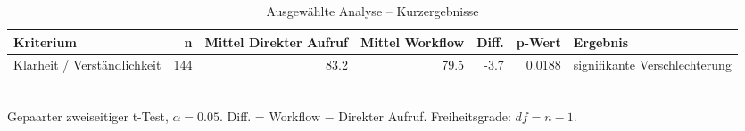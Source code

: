 \begin{table}[htbp]
\centering
\caption{Ausgewählte Analyse -- Kurzergebnisse}
\begin{tabular}{lrrrrrl}
\toprule
Kriterium & n & Mittel Direkter Aufruf & Mittel Workflow & Diff. & p-Wert & Ergebnis \\
\midrule
Klarheit / Verständlichkeit & 144 & 83.2 & 79.5 & -3.7 & 0.0188 & signifikante Verschlechterung \\
\bottomrule
\end{tabular}
\\[2mm]
\footnotesize Gepaarter zweiseitiger t-Test, $\alpha=0.05$. Diff. = Workflow $-$ Direkter Aufruf. Freiheitsgrade: $df=n-1$.
\end{table}
